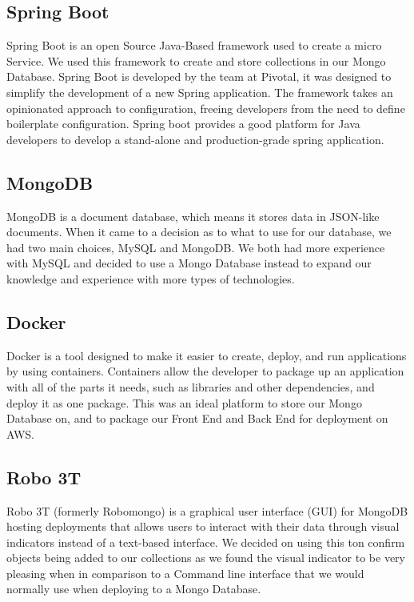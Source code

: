\subsection{Spring Boot}
Spring Boot is an open Source Java-Based framework used to create a micro Service. We used this framework to create and store collections in our Mongo Database. Spring Boot is developed by the team at Pivotal, it was designed to simplify the development of a new Spring application. The framework takes an opinionated approach to configuration, freeing developers from the need to define boilerplate configuration. Spring boot provides a good platform for Java developers to develop a stand-alone and production-grade spring application.

\subsection{MongoDB}
MongoDB is a document database, which means it stores data in JSON-like documents. When it came to a decision as to what to use for our database, we had two main choices, MySQL and MongoDB. We both had more experience with MySQL and decided to use a Mongo Database instead to expand our knowledge and experience with more types of technologies.

\subsection{Docker}
Docker is a tool designed to make it easier to create, deploy, and run applications by using containers. Containers allow the developer to package up an application with all of the parts it needs, such as libraries and other dependencies, and deploy it as one package. This was an ideal platform to store our Mongo Database on, and to package our Front End and Back End for deployment on AWS.

\subsection{Robo 3T}
Robo 3T (formerly Robomongo) is a graphical user interface (GUI) for MongoDB hosting deployments that allows users to interact with their data through visual indicators instead of a text-based interface. We decided on using this ton confirm objects being added to our collections as we found the visual indicator to be very pleasing when in comparison to a Command line interface that we would normally use when deploying to a Mongo Database.

